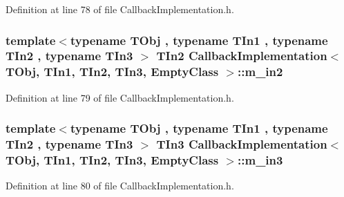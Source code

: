 Definition at line 78 of file Callback\-Implementation.\-h.

\hypertarget{class_callback_implementation_3_01_t_obj_00_01_t_in1_00_01_t_in2_00_01_t_in3_00_01_empty_class_01_4_a0f9b566ad182fe380b9b0b153fdbf6e0}{
\subsubsection[{m\-\_\-in2}]{\setlength{\rightskip}{0pt plus 5cm}template$<$typename T\-Obj , typename T\-In1 , typename T\-In2 , typename T\-In3 $>$ T\-In2 {\bf Callback\-Implementation}$<$ T\-Obj, T\-In1, T\-In2, T\-In3, {\bf Empty\-Class} $>$\-::m\-\_\-in2\hspace{0.3cm}{\ttfamily [private]}}}\label{class_callback_implementation_3_01_t_obj_00_01_t_in1_00_01_t_in2_00_01_t_in3_00_01_empty_class_01_4_a0f9b566ad182fe380b9b0b153fdbf6e0}


Definition at line 79 of file Callback\-Implementation.\-h.

\hypertarget{class_callback_implementation_3_01_t_obj_00_01_t_in1_00_01_t_in2_00_01_t_in3_00_01_empty_class_01_4_acbeca516a4e8e3eaf0aa67682855a4ab}{
\subsubsection[{m\-\_\-in3}]{\setlength{\rightskip}{0pt plus 5cm}template$<$typename T\-Obj , typename T\-In1 , typename T\-In2 , typename T\-In3 $>$ T\-In3 {\bf Callback\-Implementation}$<$ T\-Obj, T\-In1, T\-In2, T\-In3, {\bf Empty\-Class} $>$\-::m\-\_\-in3\hspace{0.3cm}{\ttfamily [private]}}}\label{class_callback_implementation_3_01_t_obj_00_01_t_in1_00_01_t_in2_00_01_t_in3_00_01_empty_class_01_4_acbeca516a4e8e3eaf0aa67682855a4ab}


Definition at line 80 of file Callback\-Implementation.\-h.

